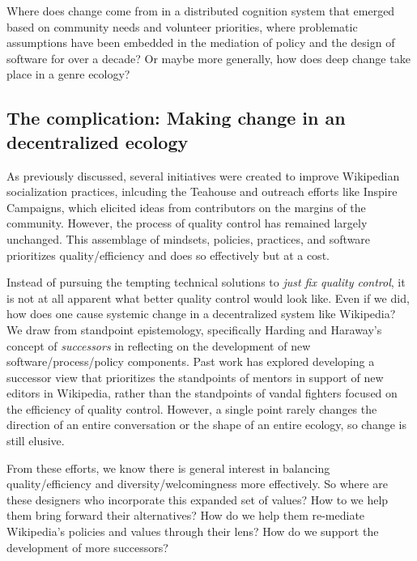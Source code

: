 Where does change come from in a distributed cognition system that emerged based on community needs and volunteer priorities, where problematic assumptions have been embedded in the mediation of policy and the design of software for over a decade?  Or maybe more generally, how does deep change take place in a genre ecology?

\subsection{The complication: Making change in an decentralized ecology}
As previously discussed, several initiatives were created to improve Wikipedian socialization practices, inlcuding the Teahouse and outreach efforts like Inspire Campaigns\cite{morgan2015what}, which elicited ideas from contributors on the margins of the community. However, the process of quality control has remained largely unchanged.  This assemblage of mindsets, policies, practices, and software prioritizes quality/efficiency and does so effectively \cite{geiger2013levee}\cite{halfaker2014snuggle} but at a cost.

Instead of pursuing the tempting technical solutions to \emph{just fix quality control}, it is not at all apparent what better quality control would look like.  Even if we did, how does one cause systemic change in a decentralized system like Wikipedia?  We draw from standpoint epistemology, specifically Harding and Haraway's concept of \emph{successors}\cite{haraway1988situated}\cite{harding1987feminism} in reflecting on the development of new software/process/policy components.  Past work has explored developing a successor view that prioritizes the standpoints of mentors in support of new editors in Wikipedia, rather than the standpoints of vandal fighters focused on the efficiency of quality control\cite{halfaker2014snuggle}\cite{geiger2014successor}. However, a single point rarely changes the direction of an entire conversation or the shape of an entire ecology, so change is still elusive.

From these efforts, we know there is general interest in balancing quality/efficiency and diversity/welcomingness more effectively.  So where are these designers who incorporate this expanded set of values?  How to we help them bring forward their alternatives?  How do we help them re-mediate Wikipedia's policies and values through their lens?  How do we support the development of more successors?

